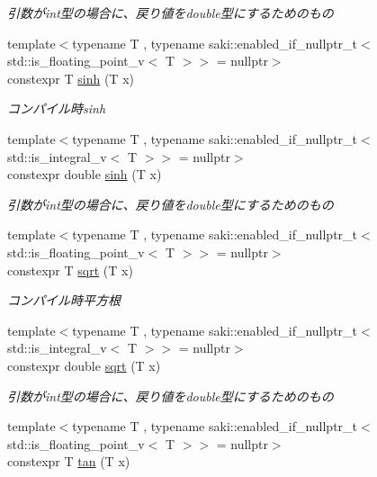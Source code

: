 \begin{DoxyCompactItemize}
\begin{DoxyCompactList}\small\item\em 引数がint型の場合に、戻り値をdouble型にするためのもの \end{DoxyCompactList}\item 
{\footnotesize template$<$typename T , typename saki\+::enabled\+\_\+if\+\_\+nullptr\+\_\+t$<$ std\+::is\+\_\+floating\+\_\+point\+\_\+v$<$ T $>$$>$  = nullptr$>$ }\\constexpr T \mbox{\hyperlink{namespacesaki_abe1ef6db83d59a5eb2daac9bff09d312}{sinh}} (T x)
\begin{DoxyCompactList}\small\item\em コンパイル時sinh \end{DoxyCompactList}\item 
{\footnotesize template$<$typename T , typename saki\+::enabled\+\_\+if\+\_\+nullptr\+\_\+t$<$ std\+::is\+\_\+integral\+\_\+v$<$ T $>$$>$  = nullptr$>$ }\\constexpr double \mbox{\hyperlink{namespacesaki_a8199390b7650fdebe491aaeb4c3a44c3}{sinh}} (T x)
\begin{DoxyCompactList}\small\item\em 引数がint型の場合に、戻り値をdouble型にするためのもの \end{DoxyCompactList}\item 
{\footnotesize template$<$typename T , typename saki\+::enabled\+\_\+if\+\_\+nullptr\+\_\+t$<$ std\+::is\+\_\+floating\+\_\+point\+\_\+v$<$ T $>$$>$  = nullptr$>$ }\\constexpr T \mbox{\hyperlink{namespacesaki_a5c2f6c98a144d6ba6683c86c865fd595}{sqrt}} (T x)
\begin{DoxyCompactList}\small\item\em コンパイル時平方根 \end{DoxyCompactList}\item 
{\footnotesize template$<$typename T , typename saki\+::enabled\+\_\+if\+\_\+nullptr\+\_\+t$<$ std\+::is\+\_\+integral\+\_\+v$<$ T $>$$>$  = nullptr$>$ }\\constexpr double \mbox{\hyperlink{namespacesaki_a66fac13294984ad19b8b7fec3b5466b5}{sqrt}} (T x)
\begin{DoxyCompactList}\small\item\em 引数がint型の場合に、戻り値をdouble型にするためのもの \end{DoxyCompactList}\item 
{\footnotesize template$<$typename T , typename saki\+::enabled\+\_\+if\+\_\+nullptr\+\_\+t$<$ std\+::is\+\_\+floating\+\_\+point\+\_\+v$<$ T $>$$>$  = nullptr$>$ }\\constexpr T \mbox{\hyperlink{namespacesaki_a491321db8475898649b625dca5401726}{tan}} (T x)

\end{DoxyCompactItemize}
